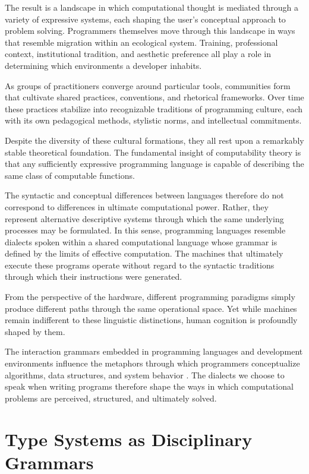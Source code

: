 \documentclass[11pt]{article}
\theoremstyle{definition}
\begin{document}
The result is a landscape in which computational thought is mediated through a variety of expressive systems, each shaping the user's conceptual approach to problem solving. Programmers themselves move through this landscape in ways that resemble migration within an ecological system. Training, professional context, institutional tradition, and aesthetic preference all play a role in determining which environments a developer inhabits.

As groups of practitioners converge around particular tools, communities form that cultivate shared practices, conventions, and rhetorical frameworks. Over time these practices stabilize into recognizable traditions of programming culture, each with its own pedagogical methods, stylistic norms, and intellectual commitments.

Despite the diversity of these cultural formations, they all rest upon a remarkably stable theoretical foundation. The fundamental insight of computability theory is that any sufficiently expressive programming language is capable of describing the same class of computable functions.

The syntactic and conceptual differences between languages therefore do not correspond to differences in ultimate computational power. Rather, they represent alternative descriptive systems through which the same underlying processes may be formulated. In this sense, programming languages resemble dialects spoken within a shared computational language whose grammar is defined by the limits of effective computation. The machines that ultimately execute these programs operate without regard to the syntactic traditions through which their instructions were generated.

From the perspective of the hardware, different programming paradigms simply produce different paths through the same operational space. Yet while machines remain indifferent to these linguistic distinctions, human cognition is profoundly shaped by them.

The interaction grammars embedded in programming languages and development environments influence the metaphors through which programmers conceptualize algorithms, data structures, and system behavior \cite{floyd1979,wadler1992}. The dialects we choose to speak when writing programs therefore shape the ways in which computational problems are perceived, structured, and ultimately solved.

\section{Type Systems as Disciplinary Grammars}
\end{document}
